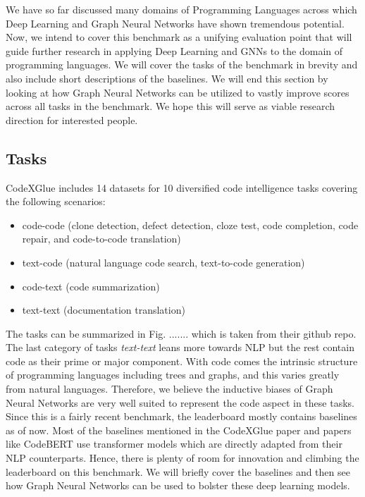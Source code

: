 \documentclass{article}
\begin{document}
We have so far discussed many domains of Programming Languages across which Deep Learning and Graph Neural Networks have shown tremendous potential. Now, we intend to cover this benchmark as a unifying evaluation point that will guide further research in applying Deep Learning and GNNs to the domain of programming languages. We will cover the tasks of the benchmark in brevity and also include short descriptions of the baselines. We will end this section by looking at how Graph Neural Networks can be utilized to vastly improve scores across all tasks in the benchmark. We hope this will serve as viable research direction for interested people.

\subsection{Tasks}
CodeXGlue includes 14 datasets for 10 diversified code intelligence tasks covering the following scenarios:
\begin{itemize}
    \item code-code (clone detection, defect detection, cloze test, code completion, code repair, and code-to-code translation)
    \item text-code (natural language code search, text-to-code generation)
    \item code-text (code summarization)
    \item text-text (documentation translation)
\end{itemize}

The tasks can be summarized in Fig. ....... which is taken from their github repo. The last category of tasks \textit{text-text} leans more towards NLP but the rest contain code as their prime or major component. With code comes the intrinsic structure of programming languages including trees and graphs, and this varies greatly from natural languages. Therefore, we believe the inductive biases of Graph Neural Networks are very well suited to represent the code aspect in these tasks. Since this is a fairly recent benchmark, the leaderboard mostly contains baselines as of now. Most of the baselines mentioned in the CodeXGlue paper and papers like CodeBERT \cite{feng2020codebert} use transformer models which are directly adapted from their NLP counterparts. Hence, there is plenty of room for innovation and climbing the leaderboard on this benchmark. We will briefly cover the baselines and then see how Graph Neural Networks can be used to bolster these deep learning models.
\end{document}
